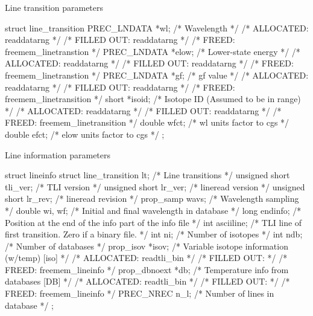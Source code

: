 \documentclass[letterpaper,12pt]{article}
\begin{document}
\noindent \newline
Line transition parameters
\begin{plain}
struct line_transition{
  PREC_LNDATA *wl;       /* Wavelength                                      */
    /* ALLOCATED:	readdatarng					    */
    /* FILLED OUT:	readdatarng					    */
    /* FREED: 		freemem_linetranstion				    */ 
  PREC_LNDATA *elow;     /* Lower-state energy                              */
    /* ALLOCATED:	readdatarng					    */
    /* FILLED OUT:	readdatarng					    */
    /* FREED: 		freemem_linetranstion				    */ 
  PREC_LNDATA *gf;       /* gf value                                        */
    /* ALLOCATED:	readdatarng					    */
    /* FILLED OUT:	readdatarng					    */
    /* FREED: 		freemem_linetransition				    */ 
  short *isoid;          /* Isotope ID (Assumed to be in range)             */
    /* ALLOCATED:	readdatarng					    */
    /* FILLED OUT:	readdatarng					    */
    /* FREED: 		freemem_linetransition				    */ 
  double wfct;           /* wl units factor to cgs                          */
  double efct;           /* elow units factor to cgs                        */
};
\end{plain}

\noindent \newline
Line information parameters
\begin{plain}
struct lineinfo{
  struct line_transition lt; /* Line transitions                            */
  unsigned short tli_ver;    /* TLI version                                 */
  unsigned short lr_ver;     /* lineread version                            */
  unsigned short lr_rev;     /* lineread revision                           */
  prop_samp wavs;            /* Wavelength sampling                         */
  double wi, wf;             /* Initial and final wavelength in database    */
  long endinfo;              /* Position at the end of the info part
                                of the info file                            */
  int asciiline;             /*  TLI line of first transition.
                                Zero if a binary file.                      */
  int ni;                    /* Number of isotopes                          */
  int ndb;                   /* Number of databases                         */
  prop_isov *isov;           /* Variable isotope information (w/temp) [iso] */
    /* ALLOCATED:	readtli_bin					    */
    /* FILLED OUT:							    */
    /* FREED: 		freemem_lineinfo				    */ 
  prop_dbnoext *db;          /* Temperature info from databases [DB]        */
    /* ALLOCATED:	readtli_bin					    */
    /* FILLED OUT:							    */
    /* FREED: 		freemem_lineinfo				    */ 
  PREC_NREC n_l;             /* Number of lines in database                 */
};
\end{plain}
\end{document}
